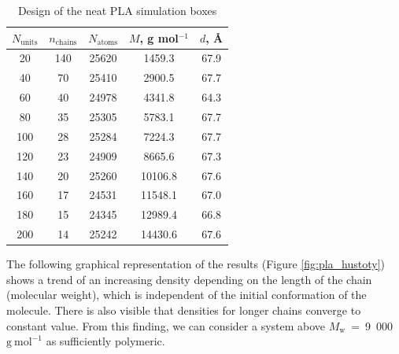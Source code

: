 \begin{table}[h]
	\centering
	\caption{Design of the neat PLA simulation boxes}
	\label{tab:pla_chains}
	\begin{tabular}{ccccc}
		\toprule
		\textbf{\boldmath$N_{\text{units}}$} & \textbf{\boldmath$n_{\text{chains}}$} & \textbf{\boldmath$N_{\text{atoms}}$} & \textbf{\boldmath$M$, g mol$^{-1}$} & \textbf{\boldmath$d$, \AA} \\
		\midrule
		20 & 140 & 25620 & 1459.3 & 67.9 \\
		40 & 70 & 25410 & 2900.5 & 67.7 \\
		60 & 40 & 24978 & 4341.8 & 64.3 \\
		80 & 35 & 25305 & 5783.1 & 67.7 \\
		100 & 28 & 25284 & 7224.3 & 67.7 \\
		120 & 23 & 24909 & 8665.6 & 67.3 \\
		140 & 20 & 25260 & 10106.8 & 67.6 \\
		160 & 17 & 24531 & 11548.1 & 67.0 \\
		180 & 15 & 24345 & 12989.4 & 66.8 \\
		200 & 14 & 25242 & 14430.6 & 67.6 \\
		\bottomrule
	\end{tabular}
\end{table}

The following graphical representation of the results (Figure \ref{fig:pla_hustoty}) shows a trend of an increasing density depending on the length of the chain (molecular weight), which is independent of the initial conformation of the molecule. There is also visible that densities for longer chains converge to constant value. From this finding, we can consider a system above $M_\mathrm{w}$~=~9~000~$\mathrm{g \ mol^{-1}}$ as sufficiently polymeric.

